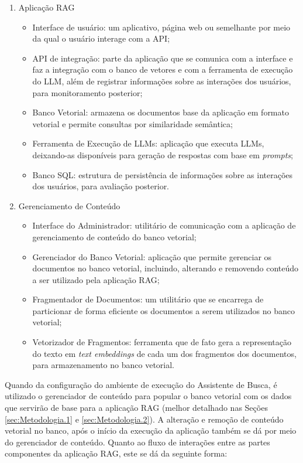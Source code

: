 \begin{enumerate}

    \item Aplicação \ac{RAG}
        \begin{itemize}
            \item Interface de usuário: um aplicativo, página web ou semelhante por meio da qual o usuário interage com a API;
            \item API de integração: parte da aplicação que  se comunica com a interface e faz a integração com o banco de vetores e com a ferramenta de execução do \ac{LLM}, além de registrar informações sobre as interações dos usuários, para monitoramento posterior;
            \item Banco Vetorial: armazena os documentos base da aplicação em formato vetorial e permite consultas por similaridade semântica;
            \item Ferramenta de Execução de \ac{LLM}s: aplicação que executa \ac{LLM}s, deixando-as disponíveis para geração de respostas com base em \textit{prompts};
            \item Banco SQL: estrutura de persistência de informações sobre as interações dos usuários, para avaliação posterior.
        \end{itemize}
    \item Gerenciamento de Conteúdo
        \begin{itemize}
        \item Interface do Administrador: utilitário de comunicação com a aplicação de gerenciamento de conteúdo do banco vetorial;
        \item Gerenciador do Banco Vetorial: aplicação que permite gerenciar os documentos no banco vetorial, incluindo, alterando e removendo conteúdo a ser utilizado pela aplicação \ac{RAG};
        \item Fragmentador de Documentos: um utilitário que se encarrega de particionar de forma eficiente os documentos a serem utilizados no banco vetorial;
        \item Vetorizador de Fragmentos: ferramenta que de fato gera a representação do texto em \textit{text embeddings} de cada um dos fragmentos dos documentos, para armazenamento no banco vetorial.
        \end{itemize}
\end{enumerate}

Quando da configuração do ambiente de execução do Assistente de Busca, é utilizado o gerenciador de conteúdo para popular o banco vetorial com os dados que servirão de base para a aplicação \ac{RAG} (melhor detalhado nas Seções \ref{sec:Metodologia.1} e \ref{sec:Metodologia.2}). A alteração e remoção de conteúdo vetorial no banco, após o início da execução da aplicação também se dá por meio do gerenciador de conteúdo. Quanto ao fluxo de interações entre as partes componentes da aplicação \ac{RAG}, este se dá da seguinte forma:

